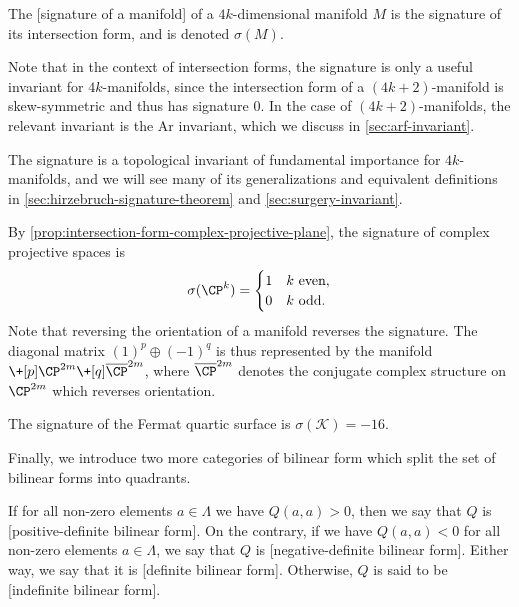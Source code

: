 \begin{definition}
\begin{definition}
	The [signature of a manifold] of a $4k$-dimensional manifold $M$ is the signature of its intersection form, and is denoted $\sigma(M)$.
\end{definition}

\begin{remark}
	Note that in the context of intersection forms, the signature is only a useful invariant for $4k$-manifolds, since the intersection form of a $(4k+2)$-manifold is skew-symmetric and thus has signature $0$. In the case of $(4k+2)$-manifolds, the relevant invariant is the Ar invariant, which we discuss in \cref{sec:arf-invariant}.
\end{remark}

The signature is a topological invariant of fundamental importance for $4k$-manifolds, and we will see many of its generalizations and equivalent definitions in \cref{sec:hirzebruch-signature-theorem} and \cref{sec:surgery-invariant}.

\begin{example}
	By \cref{prop:intersection-form-complex-projective-plane}, the signature of complex projective spaces is
	\[
		\sigma(\CP^k)=\begin{cases}1 & k\textrm{ even},\\ 0 & k\textrm{ odd}.\end{cases}
	\]
	Note that reversing the orientation of a manifold reverses the signature. The diagonal matrix $(1)^p\oplus (-1)^q$ is thus represented by the manifold $\+[p] \CP^{2m} \+[q] \overline{\CP}^{2m}$, where $\overline{\CP}^{2m}$ denotes the conjugate complex structure on $\CP^{2m}$ which reverses orientation.
\end{example}

\begin{example}
	The signature of the Fermat quartic surface is $\sigma(\mathcal{K})=-16$.
\end{example}

Finally, we introduce two more categories of bilinear form which split the set of bilinear forms into quadrants.

\begin{definition}
	If for all non-zero elements $a\in \Lambda$ we have $Q(a,a)>0$, then we say that $Q$ is [positive-definite bilinear form]. On the contrary, if we have $Q(a,a)<0$ for all non-zero elements $a\in \Lambda$, we say that $Q$ is [negative-definite bilinear form]. Either way, we say that it is [definite bilinear form]. Otherwise, $Q$ is said to be [indefinite bilinear form].
\end{definition}


\end{definition}
